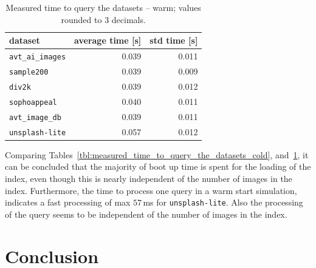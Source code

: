 \documentclass{article}
\begin{document}
\begin{table}[htb!]
\centering
\caption{Measured time to query the datasets -- warm; values rounded to 3 decimals.}
\label{tbl:measured_time_to_query_the_datasets_warm}
\begin{tabular}{lrr}
\toprule
dataset                  & average time [s] & std time [s]  \\
\midrule
\texttt{avt\_ai\_images} & 0.039            & 0.011 \\
\texttt{sample200}       & 0.039            & 0.009 \\
\texttt{div2k}           & 0.039            & 0.012 \\
\texttt{sophoappeal}     & 0.040            & 0.011 \\
\texttt{avt\_image\_db}  & 0.039            & 0.011 \\
\texttt{unsplash-lite}   & 0.057            & 0.012 \\
\bottomrule
\end{tabular}
\end{table}


Comparing Tables~\ref{tbl:measured_time_to_query_the_datasets_cold}, and~\ref{tbl:measured_time_to_query_the_datasets_warm}, it can be concluded that the majority of boot up time is spent for the loading of the index, even though this is nearly independent of the number of images in the index.
Furthermore, the time to process one query in a warm start simulation, indicates a fast processing of max $57$\,ms for \texttt{unsplash-lite}.
Also the processing of the query seems to be independent of the number of images in the index.


\section{Conclusion}




\end{document}
